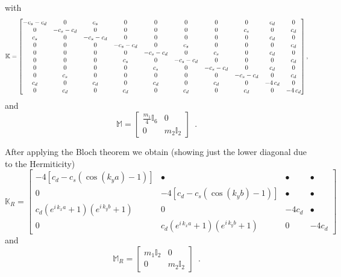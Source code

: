 \documentclass[12pt,letterpaper]{article}
\begin{document}
with
\[\mathbb{K} =\begin{bmatrix}
-{c}_{s}-{c}_{d} & 0 & {c}_{s} & 0 & 0 & 0 & 0 & 0 & {c}_{d} & 0\cr
 0 & -{c}_{s}-{c}_{d} & 0 & 0 & 0 & 0 & 0 & {c}_{s} & 0 & {c}_{d}\cr
 {c}_{s} & 0 & -{c}_{s}-{c}_{d} & 0 & 0 & 0 & 0 & 0 & {c}_{d} & 0\cr
 0 & 0 & 0 & -{c}_{s}-{c}_{d} & 0 & {c}_{s} & 0 & 0 & 0 & {c}_{d}\cr
 0 & 0 & 0 & 0 & -{c}_{s}-{c}_{d} & 0 & {c}_{s} & 0 & {c}_{d} & 0\cr
 0 & 0 & 0 & {c}_{s} & 0 & -{c}_{s}-{c}_{d} & 0 & 0 & 0 & {c}_{d}\cr
 0 & 0 & 0 & 0 & {c}_{s} & 0 & -{c}_{s}-{c}_{d} & 0 & {c}_{d} & 0\cr
 0 & {c}_{s} & 0 & 0 & 0 & 0 & 0 & -{c}_{s}-{c}_{d} & 0 & {c}_{d}\cr
 {c}_{d} & 0 & {c}_{d} & 0 & {c}_{d} & 0 & {c}_{d} & 0 & -4\,{c}_{d} & 0\cr
 0 & {c}_{d} & 0 & {c}_{d} & 0 & {c}_{d} & 0 & {c}_{d} & 0 & -4\,{c}_{d}\end{bmatrix},\]
and
\[\mathbb{M} = \begin{bmatrix}
\frac{m_1}{4}\mathbb{I}_6 & 0 \\ 
0 & m_2\mathbb{I}_2
\end{bmatrix} \enspace . \]

After applying the Bloch theorem we obtain (showing just the lower diagonal due to the Hermiticity)
\[\mathbb{K}_R = \begin{bmatrix}
-4\left[c_d - c_s(\cos(k_y a) - 1)\right]  & \bullet & \bullet & \bullet\\
 0 & -4\left[c_d - c_s(\cos(k_y b) - 1)\right]  & \bullet & \bullet\\
 c_d\left( e^{i\, k_x a}+1\right) \left( e^{i\, k_y b}+1\right)  & 0 & -4c_d & \bullet\\
 0 & c_d\left( e^{i\, k_x a}+1\right) \left( e^{i\, k_y b}+1\right)  & 0 & -4c_d
\end{bmatrix}\]
and
\[\mathbb{M}_R =\begin{bmatrix}
m_1\mathbb{I}_2 & 0 \\ 
0 & m_2\mathbb{I}_2
\end{bmatrix} \enspace .\]
\end{document}
